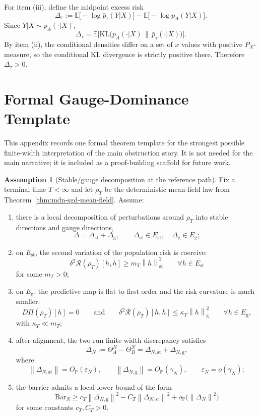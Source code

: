 \documentclass[11pt]{article}
\theoremstyle{definition}
\newtheorem{assumption}[theorem]{Assumption}
\newcommand{\E}{\mathbb{E}}
\newcommand{\Prob}{\mathbb{P}}
\newcommand{\norm}[1]{\left\lVert #1 \right\rVert}
\newcommand{\mc}[1]{\mathcal{#1}}
\begin{document}
For item (iii), define the midpoint excess risk
\[
  \Delta_\tau
  :=
  \E\big[-\log \bar p_\tau(Y|X)\big]
  -
  \E\big[-\log p_A(Y|X)\big].
\]
Since $Y|X\sim p_A(\cdot|X)$,
\[
  \Delta_\tau
  =
  \E\Big[
    \mathrm{KL}\big(p_A(\cdot|X)\,\|\,\bar p_\tau(\cdot|X)\big)
  \Big].
\]
By item (ii), the conditional densities differ on a set of $x$ values with
positive $P_X$-measure, so the conditional KL divergence is strictly positive
there. Therefore $\Delta_\tau>0$.

\section{Formal Gauge-Dominance Template}
\label{app:gauge-template}

This appendix records one formal theorem template for the strongest possible
finite-width interpretation of the main obstruction story. It is not needed for
the main narrative; it is included as a proof-building scaffold for future
work.

\begin{assumption}[Stable/gauge decomposition at the reference path]
\label{ass:gauge-dominance}
Fix a terminal time $T<\infty$ and let $\rho_T$ be the deterministic mean-field
law from Theorem~\ref{thm:mdn-sgd-mean-field}. Assume:
\begin{enumerate}[label=(GD\arabic*)]
  \item there is a local decomposition of perturbations around $\rho_T$ into
  stable directions and gauge directions,
  \[
    \Delta = \Delta_{\mathrm{st}}+\Delta_{\mathrm{g}},
    \qquad
    \Delta_{\mathrm{st}}\in E_{\mathrm{st}},
    \quad
    \Delta_{\mathrm{g}}\in E_{\mathrm{g}};
  \]
  \item on $E_{\mathrm{st}}$, the second variation of the population risk is
  coercive:
  \[
    \delta^2 \mc{R}(\rho_T)[h,h]
    \ge
    m_T \norm{h}_{\mathrm{st}}^2
    \qquad \forall h\in E_{\mathrm{st}}
  \]
  for some $m_T>0$;
  \item on $E_{\mathrm{g}}$, the predictive map is flat to first order and the
  risk curvature is much smaller:
  \[
    D\Pi(\rho_T)[h]=0
    \qquad\text{and}\qquad
    \delta^2 \mc{R}(\rho_T)[h,h]
    \le
    \kappa_T \norm{h}_{\mathrm{g}}^2
    \qquad \forall h\in E_{\mathrm{g}},
  \]
  with $\kappa_T\ll m_T$;
  \item after alignment, the two-run finite-width discrepancy satisfies
  \[
    \Delta_N
    :=
    \Theta_A^N-\Theta_B^N
    =
    \Delta_{N,\mathrm{st}}+\Delta_{N,\mathrm{g}},
  \]
  where
  \[
    \norm{\Delta_{N,\mathrm{st}}}=O_{\Prob}(\varepsilon_N),
    \qquad
    \norm{\Delta_{N,\mathrm{g}}}=O_{\Prob}(\gamma_N),
    \qquad
    \varepsilon_N=o(\gamma_N);
  \]
  \item the barrier admits a local lower bound of the form
  \[
    \mathrm{Bar}_N
    \ge
    c_T \norm{\Delta_{N,\mathrm{g}}}^2
    -
    C_T \norm{\Delta_{N,\mathrm{st}}}^2
    +
    o_{\Prob}\!\big(\norm{\Delta_N}^2\big)
  \]
  for some constants $c_T,C_T>0$.
\end{enumerate}
\end{assumption}
\end{document}
